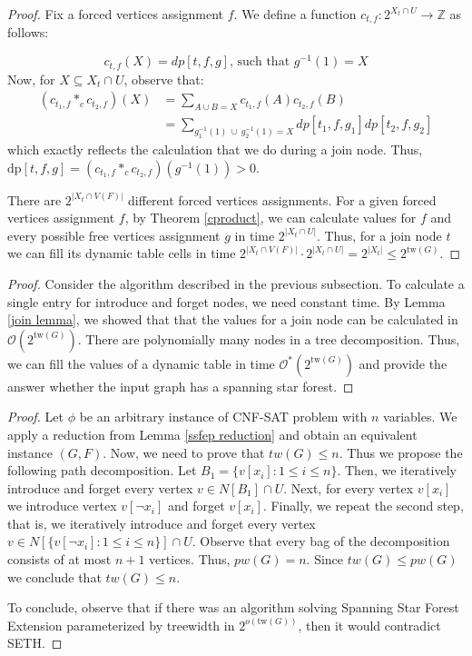 \documentclass[en]{pracamgr}
\theoremstyle{definition}
\newcommand{\ssf}{spanning star forest}
\newcommand{\ssfep}{{\sc Spanning Star Forest Extension}}
\newcommand{\cnfsat}{{\sc CNF-SAT}}
\newcommand{\dpt}[1]{\textrm{dp}[#1]}
\newcommand{\tw}{\textrm{tw}}
\begin{document}
\begin{proof}
	Fix a forced vertices assignment $f$. We define a function $c_{t,f}:2^{X_t \cap U} \rightarrow \mathbb{Z}$ as follows:
	
	\begin{equation*}
		c_{t,f}(X) = dp[t,f,g] \text{, such that $g^{-1}(1) = X$}
	\end{equation*}	
	Now, for $X \subseteq X_t \cap U$, observe that: 
	\begin{align*}
		(c_{t_1,f} *_c c_{t_2,f})(X) &= \sum\limits_{A \cup B = X} c_{t_1,f}(A)c_{t_2,f}(B) \\
		&= \sum\limits_{ g_1^{-1}(1)\ \cup\ g_2^{-1}(1) = X} dp[t_1,f,g_1]dp[t_2,f,g_2]	
	\end{align*}
	which exactly reflects the calculation that we do during a join node. Thus, $\dpt{t,f,g} = (c_{t_1,f} *_c c_{t_2,f})(g^{-1}(1)) > 0$. 
	
	There are $2^{|X_t \cap V(F)|}$ different forced vertices assignments. For a given forced vertices assignment $f$, by Theorem \ref{cproduct}, we can calculate values for $f$ and every possible free vertices assignment $g$ in time $2^{|X_t \cap U|}$. Thus, for a join node $t$ we can fill its dynamic table cells in time $2^{|X_t \cap V(F)|} \cdot 2^{|X_t \cap U|} = 2^{|X_t|} \leq 2^{\tw(G)}$.
\end{proof}

\thmssfeptwtime*

\begin{proof}
	Consider the algorithm described in the previous subsection. To calculate a single entry for introduce and forget nodes, we need constant time. By Lemma \ref{join lemma}, we showed that that the values for a join node can be calculated in $\mathcal{O}(2^{\tw(G)})$. There are polynomially many nodes in a tree decomposition. Thus, we can fill the values of a dynamic table in time $\mathcal{O}^*(2^{\tw(G)})$ and provide the answer whether the input graph has a \ssf{}.
\end{proof}

\thmssfeptwseth*

\begin{proof}
	Let $\phi$ be an arbitrary instance of \cnfsat{} problem with $n$ variables. We apply a reduction from Lemma \ref{ssfep reduction} and obtain an equivalent instance $(G,F)$. Now, we need to prove that $tw(G) \leq n$. Thus we propose the following path decomposition. Let $B_1=\{v[x_i]: 1 \leq i \leq n\}$. Then, we iteratively introduce and forget every vertex $v \in N[B_1] \cap U$. Next, for every vertex $v[x_i]$ we introduce vertex $v[\neg x_i]$ and forget $v[x_i]$. Finally, we repeat the second step, that is, we iteratively introduce and forget every vertex $v \in N[\{v[\neg x_i]: 1 \leq i \leq n\}] \cap U$. Observe that every bag of the decomposition consists of at most $n+1$ vertices. Thus, $pw(G)=n$. Since $tw(G) \leq pw(G)$ we conclude that $tw(G) \leq n$.
	
	To conclude, observe that if there was an algorithm solving \ssfep{} parameterized by treewidth in $2^{o(
		 \tw(G))}$, then it would contradict SETH.
\end{proof}
\end{document}
